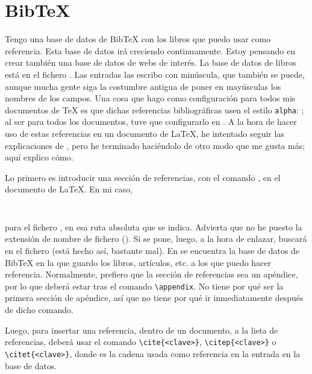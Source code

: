 \section{BibTeX}\label{sec:tex-bibtex}
Tengo una base de datos de BibTeX con los libros que puedo usar como referencia. Esta base de datos irá
creciendo continuamente. Estoy pensando en crear también una base de datos de webs de interés. La base de datos
de libros está en el fichero . Las entradas las escribo con
minúscula, que también se puede, aunque mucha gente siga la costumbre antigua de poner en mayúsculas los nombres
de los campos. Una cosa que hago como configuración para todos mis documentos de \TeX{} es que dichas
referencias bibliográficas usen el estilo \lstinline+alpha+: \lstinline++; al ser para
todos los documentos, tuve que configurarlo en . A la
hora de hacer uso de estas referencias en un documento de \LaTeX{}, he intentado seguir las explicaciones de
\cite{latex-kopka}, pero he terminado haciéndolo de otro modo que me gusta más; aquí explico cómo.

Lo primero es introducir una sección de referencias, con el comando \lstinline++, en el documento
de \LaTeX{}. En mi caso,

\begin{lstlisting}[gobble=2,language=bash,style=bashinteract,escapechar=!]
  
\end{lstlisting}

\noindent para el fichero , en esa ruta absoluta que se indica. Advierta que no he puesto la
extensión de nombre de fichero (). Si se pone, luego, a la hora de enlazar, buscará en el fichero
 (está hecho así, bastante mal). En  se encuentra la base de datos de BibTeX
en la que guardo los libros, artículos, etc. a los que puedo hacer referencia. Normalmente, prefiero que la
sección de referencias sea un apéndice, por lo que deberá estar tras el comando \lstinline+\appendix+. No tiene
por qué ser la primera sección de apéndice, así que no tiene por qué ir inmediatamente después de dicho comando.

Luego, para insertar una referencia, dentro de un documento, a la lista de referencias, deberá usar el comando
\lstinline!\cite{<clave>}!, \lstinline!\citep{<clave>}! o \lstinline!\citet{<clave>}!, donde  es la
cadena usada como referencia en la entrada en la base de datos.

